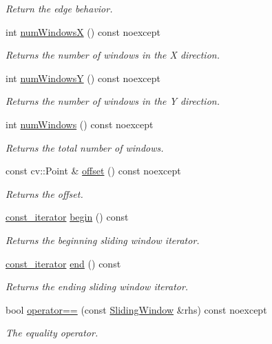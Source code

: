 \begin{DoxyCompactItemize}
\begin{DoxyCompactList}\small\item\em Return the edge behavior. \end{DoxyCompactList}\item 
int \hyperlink{group___imagery_module_ga32af1d9b6602d69bd6e000c95b6c17d6}{num\+WindowsX} () const noexcept
\begin{DoxyCompactList}\small\item\em Returns the number of windows in the X direction. \end{DoxyCompactList}\item 
int \hyperlink{group___imagery_module_gab7406512817ad61129d28a1315932fce}{num\+WindowsY} () const noexcept
\begin{DoxyCompactList}\small\item\em Returns the number of windows in the Y direction. \end{DoxyCompactList}\item 
int \hyperlink{group___imagery_module_gadcf0dadb638b7a12ce4b43c1a769279c}{num\+Windows} () const noexcept
\begin{DoxyCompactList}\small\item\em Returns the total number of windows. \end{DoxyCompactList}\item 
const cv\+::\+Point \& \hyperlink{group___imagery_module_gaab719997b423835ef06be24b605a9bc6}{offset} () const noexcept
\begin{DoxyCompactList}\small\item\em Returns the offset. \end{DoxyCompactList}\item 
\hyperlink{classdg_1_1deepcore_1_1imagery_1_1_sliding_window_aca1804ceef890966623a8acfcd01f2e9}{const\+\_\+iterator} \hyperlink{group___imagery_module_ga935a8a28313d10b815762aeb92e78629}{begin} () const 
\begin{DoxyCompactList}\small\item\em Returns the beginning sliding window iterator. \end{DoxyCompactList}\item 
\hyperlink{classdg_1_1deepcore_1_1imagery_1_1_sliding_window_aca1804ceef890966623a8acfcd01f2e9}{const\+\_\+iterator} \hyperlink{group___imagery_module_ga1c962ee19d65114b9213d2aea33503a6}{end} () const 
\begin{DoxyCompactList}\small\item\em Returns the ending sliding window iterator. \end{DoxyCompactList}\item 
bool \hyperlink{group___imagery_module_ga771dbe2b22ec6f714c0c707ed7a63c1f}{operator==} (const \hyperlink{classdg_1_1deepcore_1_1imagery_1_1_sliding_window}{Sliding\+Window} \&rhs) const noexcept
\begin{DoxyCompactList}\small\item\em The equality operator. \end{DoxyCompactList}\end{DoxyCompactItemize}


